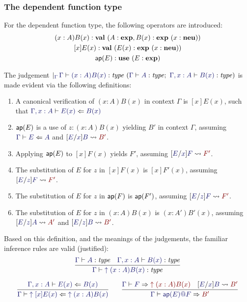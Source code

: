 \documentclass[main.tex]{subfiles}
\begin{document}
\subsubsection{The dependent function type}
For the dependent function type, the following operators are introduced:
\begin{gather*}
  \hyp{(x:A)B(x) : \val}{A:\mtm, \hyp{B(x):\mtm}{x:\rtm}}\\
  \hyp{[x]E(x) : \val}{\hyp{E(x):\mtm}{x:\rtm}}\\
  \hyp{\uap{E}:\utm}{E:\mtm}
\end{gather*}

The judgement 
$\genj{\Gamma}{%
  \hyp{%
    \lfsequent\Gamma{
      \type{(x:A)B(x)}%
    }
  }{%
    \lfsequent\Gamma{\type{A}};\ %
    \lfsequent{\Gamma,x:A}{\type{B(x)}}
  }%
}$
is made evident via the following definitions:
\begin{enumerate}
  \item A canonical verification of $(x:A)B(x)$ in context $\Gamma$ is
$[x]E(x)$, such that $\lfsequent{\Gamma,x:A}{\checks{E(x)}{B(x)}}$
  \item $\mathsf{ap}(E)$ is a use of $z:(x:A)B(x)$ yielding $B'$ in context $\Gamma$, assuming $\lfsequent\Gamma\checks{E}{A}$ and $\hsubste{E}{x}{B}{B'}$.
  \item Applying $\mathsf{ap}(E)$ to $[x]F(x)$ yields $F'$, assuming $\hsubste{E}{x}{F}{F'}$.
  \item The substitution of $E$ for $z$ in $[x]F(x)$ is $[x]F'(x)$, assuming $\hsubste{E}{z}{F}{F'}$.
  \item The substitution of $E$ for $z$ in $\mathsf{ap}(F)$ is $\mathsf{ap}(F')$, assuming $\hsubste{E}{z}{F}{F'}$.
  \item The substitution of $E$ for $z$ in $(x:A)B(x)$ is $(x:A')B'(x)$, assuming $\hsubste{E}{z}{A}{A'}$ and $\hsubste{E}{z}{B}{B'}$.
\end{enumerate}

Based on this definition, and the meanings of the judgements, the
familiar inference rules are valid (justified):
\begin{gather*}
  \infer{
    \lfsequent\Gamma\type{\ival{(x:A)B(x)}}
  }{
    \lfsequent\Gamma\type{A} &
    \lfsequent{\Gamma,x:A}\type{B(x)}
  }\\[6pt]
  \infer{
    \lfsequent\Gamma\checks{\ival{[x]E(x)}}{\ival{(x:A)B(x)}}
  }{
    \lfsequent{\Gamma,x:A}\checks{E(x)}{B(x)}
  }
  \qquad
  \infer{
    \lfsequent\Gamma\infers{\elim{\uap{E}}{F}}{B'}
  }{
    \lfsequent\Gamma\infers{F}{\ival{(x:A)B(x)}} &
    \hsubste{E}{x}{B}{B'}
  }
\end{gather*}
\end{document}
